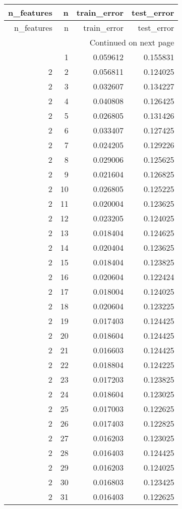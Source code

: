 \begin{longtable}{rrrr}
\toprule
n_features & n & train_error & test_error \\
\midrule
\endfirsthead
\toprule
n_features & n & train_error & test_error \\
\midrule
\endhead
\midrule
\multicolumn{4}{r}{Continued on next page} \\
\midrule
\endfoot
\bottomrule
\endlastfoot
2 & 1 & 0.059612 & 0.155831 \\
2 & 2 & 0.056811 & 0.124025 \\
2 & 3 & 0.032607 & 0.134227 \\
2 & 4 & 0.040808 & 0.126425 \\
2 & 5 & 0.026805 & 0.131426 \\
2 & 6 & 0.033407 & 0.127425 \\
2 & 7 & 0.024205 & 0.129226 \\
2 & 8 & 0.029006 & 0.125625 \\
2 & 9 & 0.021604 & 0.126825 \\
2 & 10 & 0.026805 & 0.125225 \\
2 & 11 & 0.020004 & 0.123625 \\
2 & 12 & 0.023205 & 0.124025 \\
2 & 13 & 0.018404 & 0.124625 \\
2 & 14 & 0.020404 & 0.123625 \\
2 & 15 & 0.018404 & 0.123825 \\
2 & 16 & 0.020604 & 0.122424 \\
2 & 17 & 0.018004 & 0.124025 \\
2 & 18 & 0.020604 & 0.123225 \\
2 & 19 & 0.017403 & 0.124425 \\
2 & 20 & 0.018604 & 0.124425 \\
2 & 21 & 0.016603 & 0.124425 \\
2 & 22 & 0.018804 & 0.124225 \\
2 & 23 & 0.017203 & 0.123825 \\
2 & 24 & 0.018604 & 0.123025 \\
2 & 25 & 0.017003 & 0.122625 \\
2 & 26 & 0.017403 & 0.122825 \\
2 & 27 & 0.016203 & 0.123025 \\
2 & 28 & 0.016403 & 0.124425 \\
2 & 29 & 0.016203 & 0.124025 \\
2 & 30 & 0.016803 & 0.123425 \\
2 & 31 & 0.016403 & 0.122625 \\

\end{longtable}
